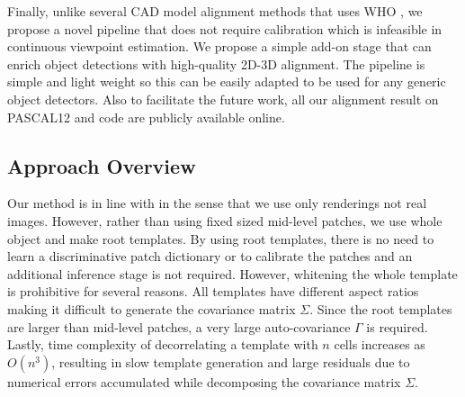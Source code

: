 Finally, unlike several CAD model alignment methods that uses  WHO \cite{Aubry13, Aubry14, Lim14}, we propose a novel pipeline that does not require calibration which is infeasible in continuous viewpoint estimation. We propose a simple add-on stage that can enrich object detections with high-quality 2D-3D alignment. The pipeline is simple and light weight so this can be easily adapted to be used for any generic object detectors. Also to facilitate the future work, all our alignment result on PASCAL12 and code are publicly available online.






\subsection{Approach Overview}

Our method is in line with \cite{Aubry14, Lim14} in the sense that we use only renderings not real images. However, rather than using fixed sized mid-level patches, we use whole object and make root templates. By using root templates, there is no need to learn a discriminative patch dictionary or to calibrate the patches and an additional inference stage is not required. However, whitening the whole template is prohibitive for several reasons. All templates have different aspect ratios making it difficult to generate the covariance matrix $\Sigma$. Since the root templates are larger than mid-level patches, a very large auto-covariance $\Gamma$ is required. Lastly, time complexity of decorrelating a template with $n$ cells increases as $O(n^3)$, resulting in slow template generation and large residuals due to numerical errors accumulated while decomposing the covariance matrix $\Sigma$. 

